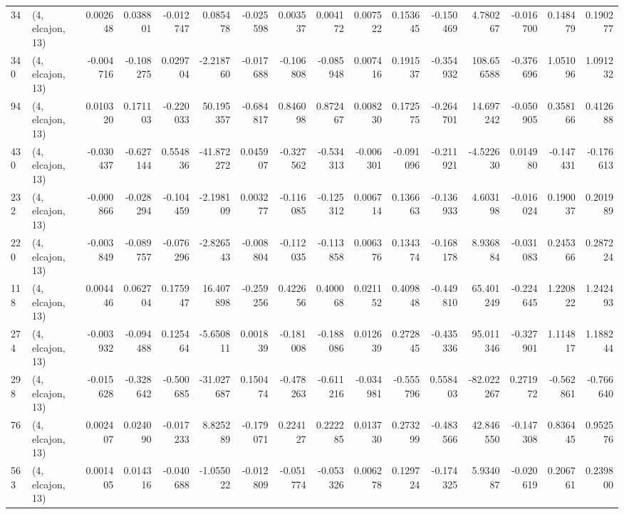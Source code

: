 \begin{tabular}{llrrrrrrrrrrrrrr}
34  &  (4, elcajon, 13) &   0.002648 &  0.038801 & -0.012747 &    0.085478 & -0.025598 &   0.003537 &  0.004172 &  0.007522 &  0.153645 & -0.150469 &    4.780267 & -0.016700 &  0.148479 &  0.190277 \\
340 &  (4, elcajon, 13) &  -0.004716 & -0.108275 &  0.029704 &   -2.218760 & -0.017688 &  -0.106808 & -0.085948 &  0.007416 &  0.191537 & -0.354932 &  108.656588 & -0.376696 &  1.051096 &  1.091232 \\
94  &  (4, elcajon, 13) &   0.010320 &  0.171103 & -0.220033 &   50.195357 & -0.684817 &   0.846098 &  0.872467 &  0.008230 &  0.172575 & -0.264701 &   14.697242 & -0.050905 &  0.358166 &  0.412688 \\
430 &  (4, elcajon, 13) &  -0.030437 & -0.627144 &  0.554836 &  -41.872272 &  0.045907 &  -0.327562 & -0.534313 & -0.006301 & -0.091096 & -0.211921 &   -4.522630 &  0.014980 & -0.147431 & -0.176613 \\
232 &  (4, elcajon, 13) &  -0.000866 & -0.028294 & -0.104459 &   -2.198109 &  0.003277 &  -0.116085 & -0.125312 &  0.006714 &  0.136663 & -0.136933 &    4.603198 & -0.016024 &  0.190037 &  0.201989 \\
220 &  (4, elcajon, 13) &  -0.003849 & -0.089757 & -0.076296 &   -2.826543 & -0.008804 &  -0.112035 & -0.113858 &  0.006376 &  0.134374 & -0.168178 &    8.936884 & -0.031083 &  0.245366 &  0.287224 \\
118 &  (4, elcajon, 13) &   0.004446 &  0.062704 &  0.175947 &   16.407898 & -0.259256 &   0.422656 &  0.400068 &  0.021152 &  0.409848 & -0.449810 &   65.401249 & -0.224645 &  1.220822 &  1.242493 \\
274 &  (4, elcajon, 13) &  -0.003932 & -0.094488 &  0.125464 &   -5.650811 &  0.001839 &  -0.181008 & -0.188086 &  0.012639 &  0.272845 & -0.435336 &   95.011346 & -0.327901 &  1.114817 &  1.188244 \\
298 &  (4, elcajon, 13) &  -0.015628 & -0.328642 & -0.500685 &  -31.027687 &  0.150474 &  -0.478263 & -0.611216 & -0.034981 & -0.555796 &  0.558403 &  -82.022267 &  0.271972 & -0.562861 & -0.766640 \\
76  &  (4, elcajon, 13) &   0.002407 &  0.024090 & -0.017233 &    8.825289 & -0.179071 &   0.224127 &  0.222285 &  0.013730 &  0.273299 & -0.483566 &   42.846550 & -0.147308 &  0.836445 &  0.952576 \\
563 &  (4, elcajon, 13) &   0.001405 &  0.014316 & -0.040688 &   -1.055022 & -0.012809 &  -0.051774 & -0.053326 &  0.006278 &  0.129724 & -0.174325 &    5.934087 & -0.020619 &  0.206761 &  0.239800 \\

\end{tabular}
